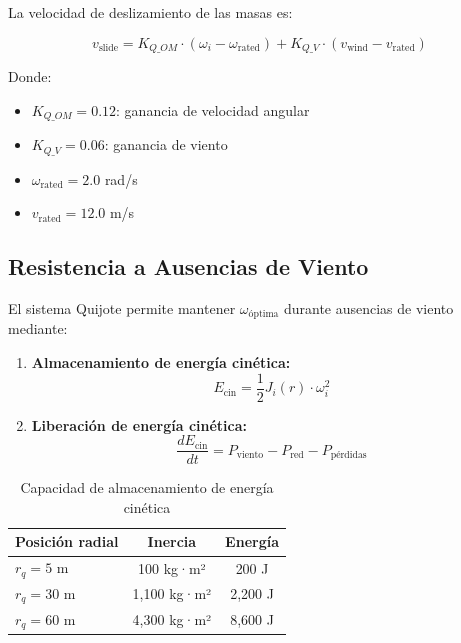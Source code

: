\documentclass[12pt,a4paper]{article}
\newcommand{\deriv}[2]{\frac{d#1}{d#2}}
\begin{document}
La velocidad de deslizamiento de las masas es:

\begin{equation}
v_{\text{slide}} = K_{Q\_OM} \cdot (\omega_i - \omega_{\text{rated}}) + K_{Q\_V} \cdot (v_{\text{wind}} - v_{\text{rated}})
\end{equation}

Donde:
\begin{itemize}
    \item $K_{Q\_OM} = 0.12$: ganancia de velocidad angular
    \item $K_{Q\_V} = 0.06$: ganancia de viento
    \item $\omega_{\text{rated}} = 2.0$ rad/s
    \item $v_{\text{rated}} = 12.0$ m/s
\end{itemize}

\subsection{Resistencia a Ausencias de Viento}

El sistema Quijote permite mantener $\omega_{\text{óptima}}$ durante ausencias de viento mediante:

\begin{enumerate}
    \item \textbf{Almacenamiento de energía cinética:}
    \begin{equation}
    E_{\text{cin}} = \frac{1}{2} J_i(r) \cdot \omega_i^2
    \end{equation}
    
    \item \textbf{Liberación de energía cinética:}
    \begin{equation}
    \deriv{E_{\text{cin}}}{t} = P_{\text{viento}} - P_{\text{red}} - P_{\text{pérdidas}}
    \end{equation}
\end{enumerate}

\begin{table}[H]
\centering
\caption{Capacidad de almacenamiento de energía cinética}
\label{tab:energia}
\begin{tabular}{@{}lcc@{}}
\toprule
\textbf{Posición radial} & \textbf{Inercia} & \textbf{Energía} \\
\midrule
$r_q = 5$ m & 100 kg·m² & 200 J \\
$r_q = 30$ m & 1,100 kg·m² & 2,200 J \\
$r_q = 60$ m & 4,300 kg·m² & 8,600 J \\
\bottomrule
\end{tabular}
\end{table}
\end{document}
